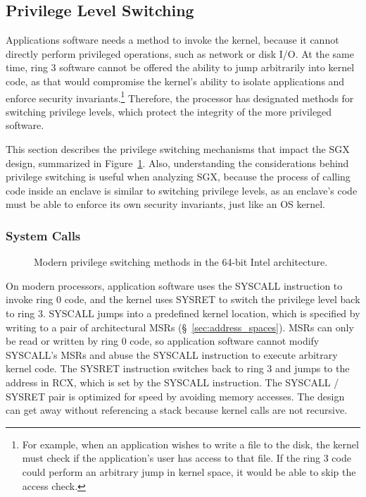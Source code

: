 \subsection{Privilege Level Switching}
\label{sec:privilege_switches}

Applications software needs a method to invoke the kernel, because it cannot
directly perform privileged operations, such as network or disk I/O. At the
same time, ring 3 software cannot be offered the ability to jump arbitrarily
into kernel code, as that would compromise the kernel's ability to isolate
applications and enforce security invariants.\footnote{For example, when an
application wishes to write a file to the disk, the kernel must check if the
application's user has access to that file. If the ring 3 code could perform
an arbitrary jump in kernel space, it would be able to skip the access check.}
Therefore, the processor has designated methods for switching privilege levels,
which protect the integrity of the more privileged software.

This section describes the privilege switching mechanisms that impact the SGX
design, summarized in Figure~\ref{fig:cpu_ring_switch}. Also, understanding the
considerations behind privilege switching is useful when analyzing SGX, because
the process of calling code inside an enclave is similar to switching privilege
levels, as an enclave's code must be able to enforce its own security
invariants, just like an OS kernel.


\subsubsection{System Calls}
\label{sec:syscalls}


\begin{figure}[hbt]
  \caption{
    Modern privilege switching methods in the 64-bit Intel architecture.
  }
  \label{fig:cpu_ring_switch}
\end{figure}

On modern processors, application software uses the SYSCALL instruction to
invoke ring 0 code, and the kernel uses SYSRET to switch the privilege level
back to ring 3. SYSCALL jumps into a predefined kernel location, which is
specified by writing to a pair of architectural MSRs
(\S~\ref{sec:address_spaces}).  MSRs can only be read or written by ring 0
code, so application software cannot modify SYSCALL's MSRs and abuse the
SYSCALL instruction to execute arbitrary kernel code. The SYSRET instruction
switches back to ring 3 and jumps to the address in RCX, which is set by the
SYSCALL instruction. The SYSCALL / SYSRET pair is optimized for speed by
avoiding memory accesses. The design can get away without referencing a stack
because kernel calls are not recursive.



